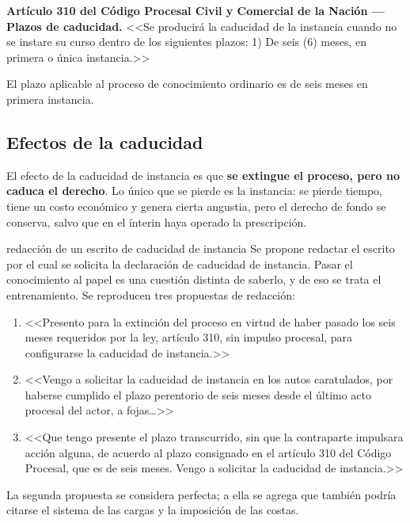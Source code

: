 \documentclass[12pt,oneside]{book}
\begin{document}
\begin{important}
\textbf{Artículo 310 del Código Procesal Civil y Comercial de la Nación --- Plazos de caducidad.} <<Se producirá la caducidad de la instancia cuando no se instare su curso dentro de los siguientes plazos: 1) De seis (6) meses, en primera o única instancia.>>

El plazo aplicable al proceso de conocimiento ordinario es de seis meses en primera instancia.
\end{important}

\subsection{Efectos de la caducidad}

El efecto de la caducidad de instancia es que \textbf{se extingue el proceso, pero no caduca el derecho}. Lo único que se pierde es la instancia: se pierde tiempo, tiene un costo económico y genera cierta angustia, pero el derecho de fondo se conserva, salvo que en el ínterin haya operado la prescripción.

\begin{exercise}{redacción de un escrito de caducidad de instancia}
Se propone redactar el escrito por el cual se solicita la declaración de caducidad de instancia. Pasar el conocimiento al papel es una cuestión distinta de saberlo, y de eso se trata el entrenamiento. Se reproducen tres propuestas de redacción:

\begin{enumerate}
    \item <<Presento para la extinción del proceso en virtud de haber pasado los seis meses requeridos por la ley, artículo 310, sin impulso procesal, para configurarse la caducidad de instancia.>>
    \item <<Vengo a solicitar la caducidad de instancia en los autos caratulados, por haberse cumplido el plazo perentorio de seis meses desde el último acto procesal del actor, a fojas\ldots>>
    \item <<Que tengo presente el plazo transcurrido, sin que la contraparte impulsara acción alguna, de acuerdo al plazo consignado en el artículo 310 del Código Procesal, que es de seis meses. Vengo a solicitar la caducidad de instancia.>>
\end{enumerate}

La segunda propuesta se considera perfecta; a ella se agrega que también podría citarse el sistema de las cargas y la imposición de las costas.
\end{exercise}
\end{document}
